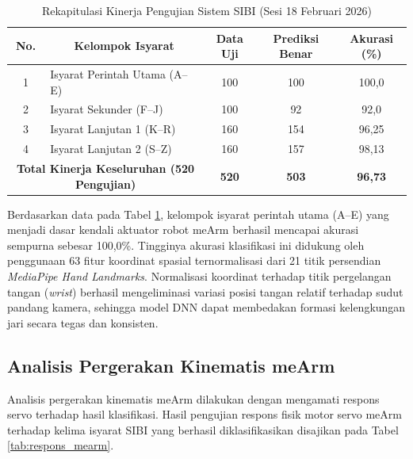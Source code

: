 \begin{table}[htbp]
\centering
\caption{Rekapitulasi Kinerja Pengujian Sistem SIBI (Sesi 18 Februari 2026)}
\label{tab:rekap_sibi}
\begin{tabular}{|c|p{6cm}|c|c|c|}
\hline
\textbf{No.} & \multicolumn{1}{c|}{\textbf{Kelompok Isyarat}} & \textbf{Data Uji} & \textbf{Prediksi Benar} & \textbf{Akurasi (\%)} \\ \hline
1 & Isyarat Perintah Utama (A--E) & 100 & 100 & 100,0 \\ \hline
2 & Isyarat Sekunder (F--J) & 100 & 92 & 92,0 \\ \hline
3 & Isyarat Lanjutan 1 (K--R) & 160 & 154 & 96,25 \\ \hline
4 & Isyarat Lanjutan 2 (S--Z) & 160 & 157 & 98,13 \\ \hline
\multicolumn{2}{|c|}{\textbf{Total Kinerja Keseluruhan (520 Pengujian)}} & \textbf{520} & \textbf{503} & \textbf{96,73} \\ \hline
\end{tabular}
\end{table}

Berdasarkan data pada Tabel \ref{tab:rekap_sibi}, kelompok isyarat perintah utama (A--E) yang menjadi dasar kendali aktuator robot meArm berhasil mencapai akurasi sempurna sebesar 100,0\%. Tingginya akurasi klasifikasi ini didukung oleh penggunaan 63 fitur koordinat spasial ternormalisasi dari 21 titik persendian \textit{MediaPipe Hand Landmarks}. Normalisasi koordinat terhadap titik pergelangan tangan (\textit{wrist}) berhasil mengeliminasi variasi posisi tangan relatif terhadap sudut pandang kamera, sehingga model DNN dapat membedakan formasi kelengkungan jari secara tegas dan konsisten.

\subsection{Analisis Pergerakan Kinematis meArm}
Analisis pergerakan kinematis meArm dilakukan dengan mengamati respons servo terhadap hasil klasifikasi. Hasil pengujian respons fisik motor servo meArm terhadap kelima isyarat SIBI yang berhasil diklasifikasikan disajikan pada Tabel \ref{tab:respons_mearm}.

